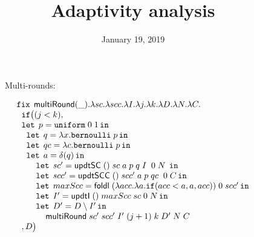 \documentclass[a4paper,11pt]{article}
\title{Adaptivity analysis}
\author{}
\date{January 19, 2019}
\theoremstyle{definition}
\begin{document}
\maketitle


\newpage
\begin{figure}

Multi-rounds:

\[
\begin{array}{l}
 \mathop{\mathtt{fix}} \;  \mathsf{multiRound}(\_). \lambda sc. \lambda scc. \lambda
  I. \lambda j. \lambda k. \lambda D. \lambda N. \lambda C. \\
 \hspace{.2cm} \mathtt{if}   \big (   (j < k)  ,  \\
  \hspace{.2cm} \mathop{\mathtt{let}} \; p = \mathtt{uniform} \; 0 \; 1 \mathop{ \mathtt{in}} \\
  \hspace{0.4cm} \mathop{\mathtt{let}} \; q = \lambda x. \mathtt{bernoulli} \; p \mathop{ \mathtt{in}} \\
 \hspace{0.4cm} \mathop{\mathtt{let}} \; qc = \lambda c. \mathtt{bernoulli} \; p \mathop{ \mathtt{in}} \\
 \hspace{0.4cm} \mathop{\mathtt{let}} \; a = \delta (q)  \mathop{ \mathtt{in}} \\
 \hspace{0.8cm} \mathop{\mathtt{let}} \; sc' =  \mathsf{updtSC} \; () \; sc  \; a \; p
 \; q \; I \;  \; 0 \;  N
  \;  \mathop{ \mathtt{in}} \\
\hspace{0.8cm} \mathop{\mathtt{let}} \; scc' =  \mathsf{updtSCC} \; () \; scc' \; a \; p
 \; qc \;  \; 0 \;  C \mathop{ \mathtt{in}} \\
\hspace{0.8cm} \mathop{\mathtt{let}} \; maxScc =  \mathsf{foldl} \; (\lambda acc. \lambda a. \mathtt{if} ( acc < a, a, acc)) \; 0 \; scc' \mathop{ \mathtt{in}} \\
\hspace{0.8cm} \mathop{\mathtt{let}} \; I' =  \mathsf{updtI}  \; () \; maxScc \; sc
  \; 0 \; N  \mathop{ \mathtt{in}} \\
  \hspace{0.8cm} \mathop{\mathtt{let}} \; D' =  D \setminus I' \mathop{ \mathtt{in}} \\
  \hspace{1.2cm} \mathsf{multiRound}  \; sc' \; scc' \; I'
  \; (j+1) \;  k \; D' \; N \; C\\ 
\hspace{0.2cm}   ,     D  \big ) \\
 

\end{array}\]
\end{figure}
\end{document}
